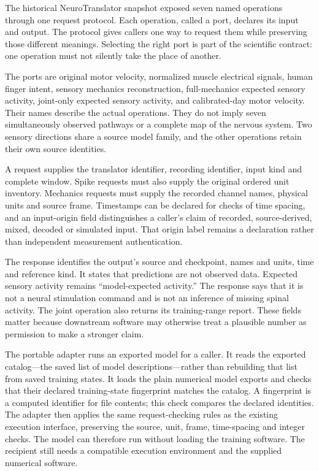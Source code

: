 The historical NeuroTranslator snapshot exposed seven named operations through one request protocol. Each operation, called a port, declares its input and output. The protocol gives callers one way to request them while preserving those different meanings. Selecting the right port is part of the scientific contract: one operation must not silently take the place of another.

The ports are original motor velocity, normalized muscle electrical signals, human finger intent, sensory mechanics reconstruction, full-mechanics expected sensory activity, joint-only expected sensory activity, and calibrated-day motor velocity. Their names describe the actual operations. They do not imply seven simultaneously observed pathways or a complete map of the nervous system. Two sensory directions share a source model family, and the other operations retain their own source identities.

A request supplies the translator identifier, recording identifier, input kind and complete window. Spike requests must also supply the original ordered unit inventory. Mechanics requests must supply the recorded channel names, physical units and source frame. Timestamps can be declared for checks of time spacing, and an input-origin field distinguishes a caller's claim of recorded, source-derived, mixed, decoded or simulated input. That origin label remains a declaration rather than independent measurement authentication.

The response identifies the output's source and checkpoint, names and units, time and reference kind. It states that predictions are not observed data. Expected sensory activity remains ``model-expected activity.'' The response says that it is not a neural stimulation command and is not an inference of missing spinal activity. The joint operation also returns its training-range report. These fields matter because downstream software may otherwise treat a plausible number as permission to make a stronger claim.

The portable adapter runs an exported model for a caller. It reads the exported
catalog---the saved list of model descriptions---rather than rebuilding that
list from saved training states. It loads the plain numerical model exports
and checks that their declared training-state fingerprint matches the catalog.
A fingerprint is a computed identifier for file contents; this check compares
the declared identities. The adapter then applies the same request-checking
rules as the existing execution interface, preserving the source, unit, frame,
time-spacing and integer checks. The model can therefore run without loading
the training software. The recipient still needs a compatible execution
environment and the supplied numerical software.

